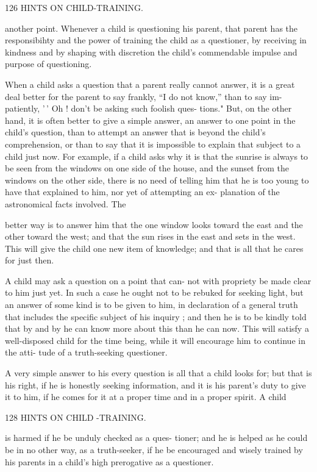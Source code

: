 \documentclass[
]{book}
\begin{document}
126 HINTS ON CHILD-TRAINING.

another point. Whenever a child is questioning his parent, that parent has the responsibihty and the power of training the child as a questioner, by receiving in kindness and by shaping with discretion the child's commendable impulse and purpose of questioning.

When a child asks a question that a parent really cannot answer, it is a great deal better for the parent to say frankly, ``I do not know,'' than to say im- patiently, '\,' Oh ! don't be asking such foolish ques- tions." But, on the other hand, it is often better to give a simple answer, an answer to one point in the child's question, than to attempt an answer that is beyond the child's comprehension, or than to say that it is impossible to explain that subject to a child just now. For example, if a child asks why it is that the sunrise is always to be seen from the windows on one side of the house, and the sunset from the windows on the other side, there is no need of telling him that he is too young to have that explained to him, nor yet of attempting an ex- planation of the astronomical facts involved. The

better way is to answer him that the one window looks toward the east and the other toward the west; and that the sun rises in the east and sets in the west. This will give the child one new item of knowledge; and that is all that he cares for just then.

A child may ask a question on a point that can- not with propriety be made clear to him just yet. In such a case he ought not to be rebuked for seeking light, but an answer of some kind is to be given to him, in declaration of a general truth that includes the specific subject of his inquiry ; and then he is to be kindly told that by and by he can know more about this than he can now. This will satisfy a well-disposed child for the time being, while it will encourage him to continue in the atti- tude of a truth-seeking questioner.

A very simple answer to his every question is all that a child looks for; but that is his right, if he is honestly seeking information, and it is his parent's duty to give it to him, if he comes for it at a proper time and in a proper spirit. A child

128 HINTS ON CHILD -TRAINING.

is harmed if he be unduly checked as a ques- tioner; and he is helped as he could be in no other way, as a truth-seeker, if he be encouraged and wisely trained by his parents in a child's high prerogative as a questioner.
\end{document}
